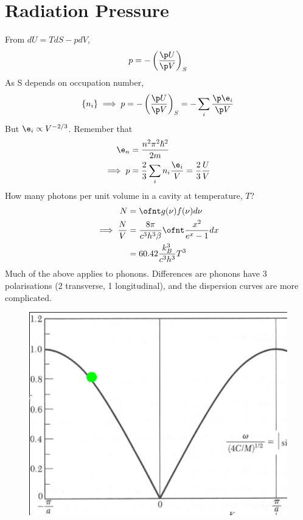 \documentclass[a4paper, 11pt, normalem]{report}
\begin{document}
\section{Radiation Pressure}
From $dU = TdS - pdV$,
\begin{equation}
    p = -\left(\frac{\p U}{\p V}\right)_S
\end{equation}
As S depends on occupation number, 
\begin{equation}
    \{n_i\} \implies p = -\left(\frac{\p U}{\p V}\right)_S = -\sum_i \frac{\p\e_i}{\p V}
\end{equation}
But $\e_i \propto V^{-2/3}$. 
Remember that
\begin{align}
    \e_n &= \frac{n^2\pi^2\hbar^2}{2m} \\
    \implies p &= \frac{2}{3}\sum_i n_i\frac{\e_i}{V} = \frac{2}{3}\frac{U}{V}
\end{align}
How many photons per unit volume in a cavity at temperature, $T$?
\begin{align}
    N &= \ofnt g(\nu)f(\nu)d\nu \\
    \implies \frac{N}{V} &= \frac{8\pi}{c^3h^3\beta} \ofnt \frac{x^2}{e^x - 1}dx \\
                         &= 60.42 \frac{k_B^3}{c^3h^3}T^3
\end{align}
Much of the above applies to phonons. 
Differences are phonons have 3 polarisations (2 transverse, 1 longitudinal), and the dispersion curves are more complicated.
\begin{figure}[H]
    \centering
    \includegraphics[scale=0.5]{brill.png}
\end{figure}
\end{document}
